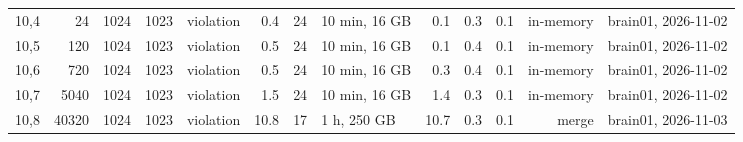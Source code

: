 \documentclass[10pt]{article}
\begin{document}
\begin{longtable}{@{}rrrrlrrlrrrrl@{}}
\color{red} 10,4 & 24 & 1024 & 1023 & violation & 0.4 & 24 & 10 min, 16 GB & 0.1 & 0.3 & 0.1 & in-memory & brain01, 2026-11-02 \\
\color{red} 10,5 & 120 & 1024 & 1023 & violation & 0.5 & 24 & 10 min, 16 GB & 0.1 & 0.4 & 0.1 & in-memory & brain01, 2026-11-02 \\
\color{red} 10,6 & 720 & 1024 & 1023 & violation & 0.5 & 24 & 10 min, 16 GB & 0.3 & 0.4 & 0.1 & in-memory & brain01, 2026-11-02 \\
\color{red} 10,7 & 5040 & 1024 & 1023 & violation & 1.5 & 24 & 10 min, 16 GB & 1.4 & 0.3 & 0.1 & in-memory & brain01, 2026-11-02 \\
\color{blue} 10,8 & 40320 & 1024 & 1023 & violation & 10.8 & 17 & 1 h, 250 GB & 10.7 & 0.3 & 0.1 & merge & brain01, 2026-11-03 \\
\bottomrule
\end{longtable}
\end{document}
